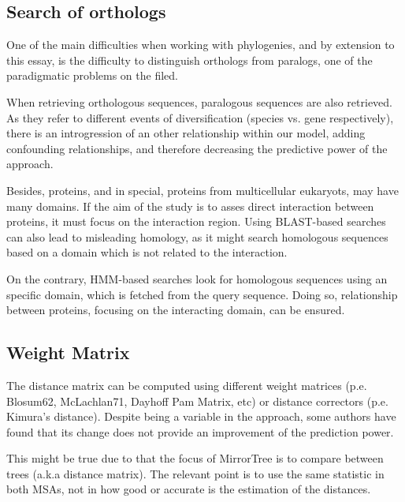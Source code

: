 \documentclass[11pt]{article}
\begin{document}
\subsection{Search of orthologs}
One of the main difficulties when working with phylogenies, and by extension to this essay, is the difficulty to distinguish orthologs from paralogs, one of the paradigmatic problems on the filed. 

When retrieving orthologous sequences, paralogous sequences are also retrieved. As they refer to different events of diversification (species vs. gene respectively), there is an introgression of an other relationship within our model, adding confounding relationships, and therefore decreasing the predictive power of the approach.

Besides, proteins, and in special, proteins from multicellular eukaryots, may have many domains. If the aim of the study is to asses direct interaction between proteins, it must focus on the interaction region. Using BLAST-based searches can also lead to misleading homology, as it might search homologous sequences based on a domain which is not related to the interaction.

On the contrary, HMM-based searches look for homologous sequences using an specific domain, which is fetched from the query sequence. Doing so, relationship between proteins, focusing on the interacting domain, can be ensured.


\subsection{Weight Matrix}
The distance matrix can be computed using different weight matrices (p.e. Blosum62, McLachlan71, Dayhoff Pam Matrix, etc) or distance correctors (p.e. Kimura's distance). Despite being a variable in the approach, some authors\cite{Zhou13} have found that its change does not provide an improvement of the prediction power.

This might be true due to that the focus of MirrorTree is to compare between trees (a.k.a distance matrix). The relevant point is to use the same statistic in both MSAs, not in how good or accurate is the estimation of the distances.
\end{document}
